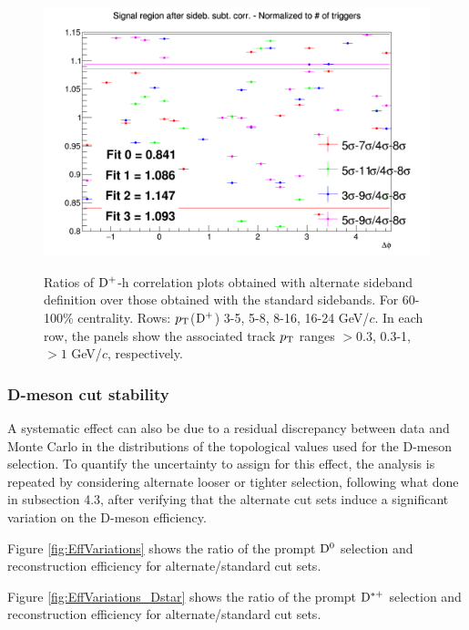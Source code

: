 \begin{figure}
{\includegraphics[width=0.31\linewidth]{Centrality_DPlus/Dplus/Systematic/60_100/Side_band_60_100/Ratio_AzimCorrDistr_Dplus_Canvas_PtIntBins11to11_PoolInt_thr1dotto99dot.png}} \\
 \caption{Ratios of ${\rm D^+}$-h correlation plots obtained with alternate sideband definition over those obtained with the standard sidebands. For 60-100\% centrality. Rows: $p_{\rm T}$(${\rm D^+}$) 3-5, 5-8, 8-16, 16-24 GeV/$c$. In each row, the panels show the associated track $p_{\rm T}$ ranges $> 0.3$, 0.3-1, $> 1$ GeV/$c$, respectively.}
\label{fig:SysBkg60100_Dplus}
\end{figure}
\clearpage

\subsubsection{D-meson cut stability}
A systematic effect can also be due to a residual discrepancy between data and Monte Carlo in the distributions of the topological values used for the D-meson selection. To quantify the uncertainty to assign for this effect, the analysis is repeated by considering alternate looser or tighter selection, following what done in subsection 4.3, after verifying that the alternate cut sets induce a significant variation on the D-meson efficiency.

Figure \ref{fig:EffVariations} shows the ratio of the prompt ${\rm D^0}$ selection and reconstruction efficiency for alternate/standard cut sets.

Figure \ref{fig:EffVariations_Dstar} shows the ratio of the prompt ${\rm D^{*+}}$ selection and reconstruction efficiency for alternate/standard cut sets.

